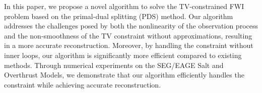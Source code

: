In this paper, we propose a novel algorithm to solve the TV-constrained FWI problem based on the primal-dual splitting (PDS) method.
Our algorithm addresses the challenges posed by both the nonlinearity of the observation process and the non-smoothness of the TV constraint without approximations, resulting in a more accurate reconstruction.
Moreover, by handling the constraint without inner loops, our algorithm is significantly more efficient compared to existing methods.
Through numerical experiments on the SEG/EAGE Salt and Overthrust Models, we demonstrate that our algorithm efficiently handles the constraint while achieving accurate reconstruction.
